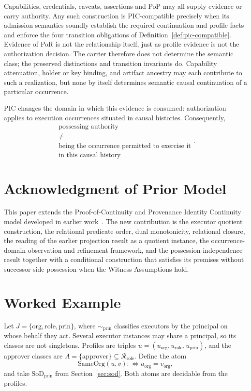 \documentclass[10pt,twocolumn]{article}
\newcommand{\Rel}{\mathcal{R}}
\begin{document}
Capabilities, credentials, caveats, assertions and PoP may all supply evidence
or carry authority. Any such construction is PIC-compatible precisely when its
admission semantics soundly establish the required continuation and profile
facts and enforce the four transition obligations of
Definition~\ref{def:pic-compatible}. Evidence of PoR is not the relationship
itself, just as profile evidence is not the authorization decision. The carrier
therefore does not determine the semantic class; the preserved distinctions and
transition invariants do. Capability attenuation, holder or key binding, and
artifact ancestry may each contribute to such a realization, but none by
itself determines semantic causal continuation of a particular occurrence.

PIC changes the domain in which this evidence is consumed: authorization
applies to execution occurrences situated in causal histories.
Consequently,
\[
\boxed{
\begin{array}{c}
\text{possessing authority}\\
\neq\\
\text{being the occurrence permitted to exercise it}\\
\text{in this causal history}
\end{array}
}.
\]

\section*{Acknowledgment of Prior Model}

This paper extends the Proof-of-Continuity and Provenance Identity Continuity
model developed in earlier work~\cite{gallo2026poc}. The new
contribution is the executor quotient construction, the relational predicate
order, dual monotonicity, relational closure, the reading of the earlier
projection result as a quotient instance, the occurrence-domain observation
and refinement framework, and the possession-independence result together with
a conditional construction that satisfies its premises without successor-side
possession when the Witness Assumptions hold.

\appendix
\section{Worked Example}
\label{app:example}

Let \(J=\{\mathrm{org},\mathrm{role},\mathrm{prin}\}\), where
\(\sim_{\mathrm{prin}}\) classifies executors by the principal on whose behalf
they act. Several executor instances may share a principal, so its classes are
not singletons. Profiles are triples
\(u=(u_{\mathrm{org}},u_{\mathrm{role}},u_{\mathrm{prin}})\), and the approver
classes are \(A=\{\mathrm{approver}\}\subseteq\Rel_{\mathrm{role}}\). Define the
atom
\[
\mathrm{SameOrg}(u,v):\Longleftrightarrow u_{\mathrm{org}}=v_{\mathrm{org}},
\]
and take \(\mathrm{SoD}_{\mathrm{prin}}\) from Section~\ref{sec:sod}. Both atoms
are decidable from the profiles.
\end{document}
